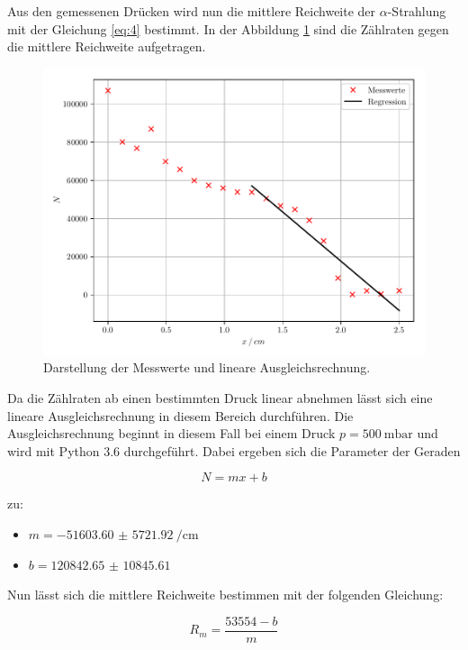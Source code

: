 Aus den gemessenen Drücken wird nun die mittlere Reichweite der $\alpha$-Strahlung
mit der Gleichung \ref{eq:4} bestimmt. In der Abbildung \ref{abb:2} sind die Zählraten
gegen die mittlere Reichweite aufgetragen.

\begin{figure}[H]
  \centering
  \includegraphics{plot1.pdf}
  \caption{Darstellung der Messwerte und lineare Ausgleichsrechnung.}
  \label{abb:2}
\end{figure}

Da die Zählraten ab einen bestimmten Druck linear abnehmen lässt sich eine lineare
Ausgleichsrechnung in diesem Bereich durchführen. Die Ausgleichsrechnung beginnt in
diesem Fall bei einem Druck $p = \SI{500}{\milli\bar}$ und wird mit Python 3.6
durchgeführt. Dabei ergeben sich die Parameter
der Geraden

\begin{equation}
  N = mx + b
\end{equation}

zu:

\begin{itemize}
  \item $m = \SI{-51603.60(572192)}{\per\centi\meter}$
  \item $b = \num{120842.65(1084561)}$
\end{itemize}

Nun lässt sich die mittlere Reichweite bestimmen mit der folgenden Gleichung:

\begin{equation}
  R_m = \frac{53554-b}{m}
  \label{eq:5}
\end{equation}


